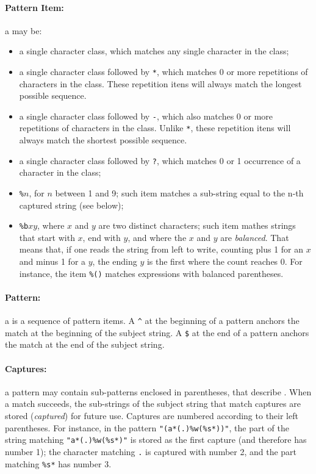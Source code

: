 \paragraph{Pattern Item:}
a  may be:
\begin{itemize}
\item
a single character class,
which matches any single character in the class;
\item
a single character class followed by \verb'*',
which matches 0 or more repetitions of characters in the class.
These repetition itens will always match the longest possible sequence.
\item
a single character class followed by \verb'-',
which also matches 0 or more repetitions of characters in the class.
Unlike \verb'*',
these repetition itens will always match the shortest possible sequence.
\item
a single character class followed by \verb'?',
which matches 0 or 1 occurrence of a character in the class;
\item
{\tt \%$n$}, for $n$ between 1 and 9;
such item matches a sub-string equal to the n-th captured string
(see below);
\item
{\tt \%b$xy$}, where $x$ and $y$ are two distinct characters;
such item mathes strings that start with $x$, end with $y$,
and where the $x$ and $y$ are {\em balanced}.
That means that, if one reads the string from left to write,
counting plus 1 for an $x$ and minus 1 for a $y$,
the ending $y$ is the first where the count reaches 0.
For instance, the item \verb|%()| matches expressions with
balanced parentheses.
\end{itemize}

\paragraph{Pattern:}
a  is a sequence of pattern items.
A \verb'^' at the beginning of a pattern anchors the match at the
beginning of the subject string.
A \verb'$' at the end of a pattern anchors the match at the
end of the subject string.

\paragraph{Captures:}
a pattern may contain sub-patterns enclosed in parentheses,
that describe .
When a match succeeds, the sub-strings of the subject string
that match captures are stored ({\em captured\/}) for future use.
Captures are numbered according to their left parentheses.
For instance, in the pattern \verb|"(a*(.)%w(%s*))"|,
the part of the string matching \verb|"a*(.)%w(%s*)"| is
stored as the first capture (and therefore has number 1);
the character matching \verb|.| is captured with number 2,
and the part matching \verb|%s*| has number 3.

